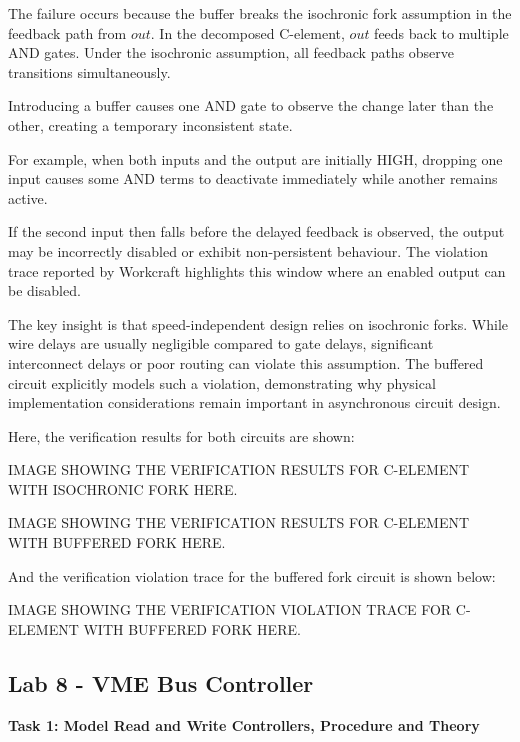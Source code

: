 \documentclass[a4paper,12pt]{article}
\begin{document}
The failure occurs because the buffer breaks the isochronic fork assumption in the feedback path from $out$. In the decomposed C-element, $out$ feeds back to multiple AND gates. Under the isochronic assumption, all feedback paths observe transitions simultaneously. 

Introducing a buffer causes one AND gate to observe the change later than the other, creating a temporary inconsistent state.

For example, when both inputs and the output are initially HIGH, dropping one input causes some AND terms to deactivate immediately while another remains active. 

If the second input then falls before the delayed feedback is observed, the output may be incorrectly disabled or exhibit non-persistent behaviour. 
The violation trace reported by Workcraft highlights this window where an enabled output can be disabled.

The key insight is that speed-independent design relies on isochronic forks. While wire delays are usually negligible compared to gate delays, significant interconnect delays or poor routing can violate this assumption. 
The buffered circuit explicitly models such a violation, demonstrating why physical implementation considerations remain important in asynchronous circuit design.

Here, the verification results for both circuits are shown:

\begin{large}
    IMAGE SHOWING THE VERIFICATION RESULTS FOR C-ELEMENT WITH ISOCHRONIC FORK HERE.
\end{large}

\begin{large}
    IMAGE SHOWING THE VERIFICATION RESULTS FOR C-ELEMENT WITH BUFFERED FORK HERE.
\end{large}

And the verification violation trace for the buffered fork circuit is shown below:

\begin{large}
    IMAGE SHOWING THE VERIFICATION VIOLATION TRACE FOR C-ELEMENT WITH BUFFERED FORK HERE.
\end{large}

\subsection{Lab 8 - VME Bus Controller}

\textbf{Task 1: Model Read and Write Controllers, Procedure and Theory}
\end{document}
